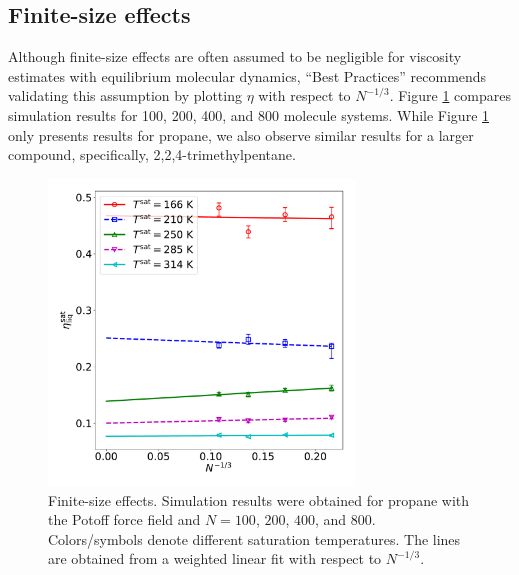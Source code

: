 \documentclass[preprint,review,12pt]{elsarticle}
\begin{document}
	\subsection{Finite-size effects}

	Although finite-size effects are often assumed to be negligible for viscosity estimates with equilibrium molecular dynamics, ``Best Practices'' recommends validating this assumption by plotting $\eta$ with respect to $N^{-1/3}$. Figure \ref{fig:finite_size_effects} compares simulation results for 100, 200, 400, and 800 molecule systems. While Figure \ref{fig:finite_size_effects} only presents results for propane, we also observe similar results for a larger compound, specifically, 2,2,4-trimethylpentane.
	
	
	
	
	\begin{figure}[htb!]
		\centering
		\includegraphics[width=3.2in]{C3H8_Potoff_finite_size_effects.pdf}
		\caption{Finite-size effects. Simulation results were obtained for propane with the Potoff force field and $N= 100$, $200$, $400$, and $800$. Colors/symbols denote different saturation temperatures. The lines are obtained from a weighted linear fit with respect to $N^{-1/3}$.}
		\label{fig:finite_size_effects}
	\end{figure} 
	
\end{document}

